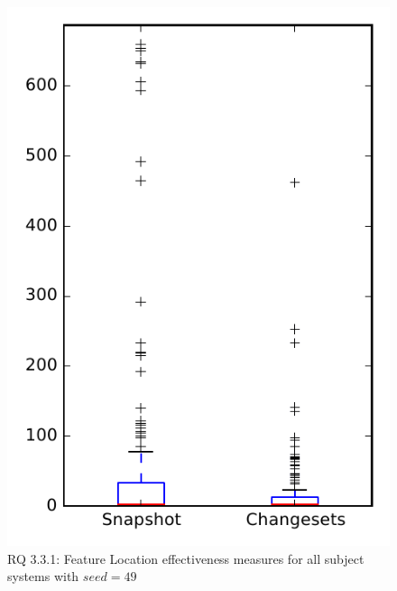 
\begin{figure}
\centering
\includegraphics[height=0.4\textheight]{figures/flt_seed/rq1_overview_49}
\caption{RQ 3.3.1: Feature Location effectiveness measures for all subject systems with $seed=49$}
\label{fig:flt_seed:rq1:overview}
\end{figure}
